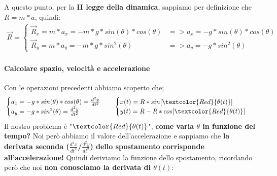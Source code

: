             A questo punto, per la \textbf{II legge della dinamica}, sappiamo per definizione che $R = m*a$, quindi:
            \begin{align*}
                \vec{R}=
                \begin{cases}
                    \vec{R}_x = m*a_x = -m*g*sin(\theta)*cos(\theta) & => a_x = -g*sin(\theta)*cos(\theta)\\
                    \vec{R}_y = m*a_y = -m*g*sin^2(\theta) & => a_y = -g*sin^2(\theta)
                \end{cases}
            \end{align*}

            \paragraph{Calcolare spazio, velocità e accelerazione}
                Con le operazioni precedenti abbiamo scoperto che;
                \begin{align*}
                    &\begin{cases}
                        a_x = -g*sin(\theta)*cos(\theta) = \frac{d^2x}{dt^2}\\
                        a_y = -g*sin^2(\theta) = \frac{d^2y}{dt^2}
                    \end{cases}&&
                    \begin{cases}
                        x(t) = R*sin[\textcolor{Red}{\theta(t)}]\\
                        y(t) = R-R*cos[\textcolor{Red}{\theta(t)}]
                    \end{cases}
                \end{align*}
                Il nostro problema è "$\textcolor{Red}{\theta(t)}$", \textbf{come varia $\theta$ in funzione del tempo?} Noi però abbiamo il valore dell'accelerazione e sappiamo che \textbf{la derivata seconda ($\frac{d^2x}{dt^2}$/$\frac{d^2y}{dt^2}$) dello spostamento corrisponde all'accelerazione!} Quindi deriviamo la funzione dello spostamento, ricordando però che noi \textbf{non conosciamo la derivata di $\theta(t)$}:
